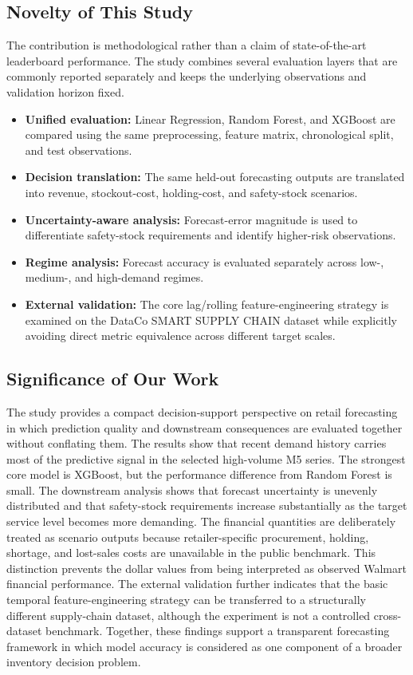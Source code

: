 \subsection{Novelty of This Study}

The contribution is methodological rather than a claim of state-of-the-art leaderboard performance.
The study combines several evaluation layers that are commonly reported separately and keeps the underlying observations and validation horizon fixed.

\begin{itemize}
    \item \textbf{Unified evaluation:} Linear Regression, Random Forest, and XGBoost are compared using the same preprocessing, feature matrix, chronological split, and test observations.
    \item \textbf{Decision translation:} The same held-out forecasting outputs are translated into revenue, stockout-cost, holding-cost, and safety-stock scenarios.
    \item \textbf{Uncertainty-aware analysis:} Forecast-error magnitude is used to differentiate safety-stock requirements and identify higher-risk observations.
    \item \textbf{Regime analysis:} Forecast accuracy is evaluated separately across low-, medium-, and high-demand regimes.
    \item \textbf{External validation:} The core lag/rolling feature-engineering strategy is examined on the DataCo SMART SUPPLY CHAIN dataset while explicitly avoiding direct metric equivalence across different target scales.
\end{itemize}

\subsection{Significance of Our Work}

The study provides a compact decision-support perspective on retail forecasting in which prediction quality and downstream consequences are evaluated together without conflating them.
The results show that recent demand history carries most of the predictive signal in the selected high-volume M5 series.
The strongest core model is XGBoost, but the performance difference from Random Forest is small.
The downstream analysis shows that forecast uncertainty is unevenly distributed and that safety-stock requirements increase substantially as the target service level becomes more demanding.
The financial quantities are deliberately treated as scenario outputs because retailer-specific procurement, holding, shortage, and lost-sales costs are unavailable in the public benchmark.
This distinction prevents the dollar values from being interpreted as observed Walmart financial performance.
The external validation further indicates that the basic temporal feature-engineering strategy can be transferred to a structurally different supply-chain dataset, although the experiment is not a controlled cross-dataset benchmark.
Together, these findings support a transparent forecasting framework in which model accuracy is considered as one component of a broader inventory decision problem.

